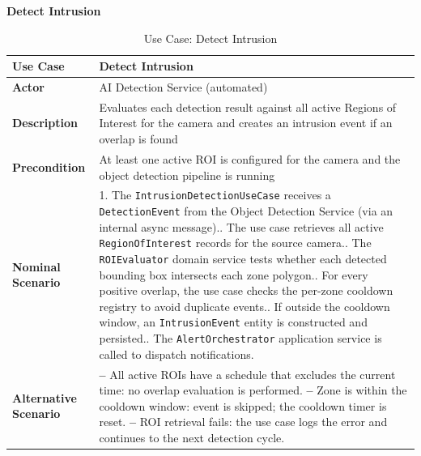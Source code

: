\textbf{Detect Intrusion}
\begin{table}[H]
\centering\small
\begin{tabular}{|>{\bfseries}p{3cm}|p{10cm}|}
\hline
Use Case    & Detect Intrusion \\ \hline
Actor       & AI Detection Service (automated) \\ \hline
Description & Evaluates each detection result against all active Regions of Interest for the camera and creates an intrusion event if an overlap is found \\ \hline
Precondition & At least one active ROI is configured for the camera and the object detection pipeline is running \\ \hline
Nominal Scenario &
1. The \texttt{IntrusionDetectionUseCase} receives a \texttt{DetectionEvent} from the Object Detection Service (via an internal async message).\newline
2. The use case retrieves all active \texttt{RegionOfInterest} records for the source camera.\newline
3. The \texttt{ROIEvaluator} domain service tests whether each detected bounding box intersects each zone polygon.\newline
4. For every positive overlap, the use case checks the per-zone cooldown registry to avoid duplicate events.\newline
5. If outside the cooldown window, an \texttt{IntrusionEvent} entity is constructed and persisted.\newline
6. The \texttt{AlertOrchestrator} application service is called to dispatch notifications. \\ \hline
Alternative Scenario &
\textbf{--} All active ROIs have a schedule that excludes the current time: no overlap evaluation is performed.\newline
\textbf{--} Zone is within the cooldown window: event is skipped; the cooldown timer is reset.\newline
\textbf{--} ROI retrieval fails: the use case logs the error and continues to the next detection cycle. \\ \hline
\end{tabular}
\caption{Use Case: Detect Intrusion}
\label{tab:uc_intrusion}
\end{table}

